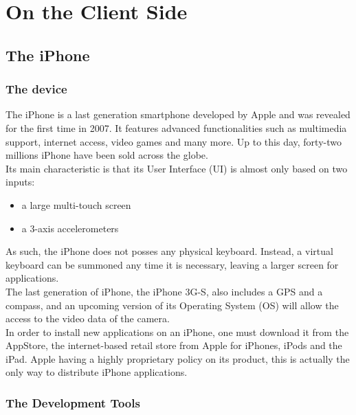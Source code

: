 \chapter{On the Client Side}
\label{cha:on_the_client_side}

\section{The iPhone}
\label{sec:the_iphone}

\subsection{The device}
The iPhone is a last generation smartphone developed by Apple and was revealed for the first time in 2007. It features advanced functionalities such as multimedia support, internet access, video games and many more. Up to this day, forty-two millions iPhone have been sold across the globe.\\

Its main characteristic is that its User Interface (UI) is almost only based on two inputs:
\begin{itemize}
\item{a large multi-touch screen}
\item{a 3-axis accelerometers}
\end{itemize}
As such, the iPhone does not posses any physical keyboard. Instead, a virtual keyboard can be summoned any time it is necessary, leaving a larger screen for applications.\\

The last generation of iPhone, the iPhone 3G-S, also includes a GPS and a compass, and an upcoming version of its Operating System (OS) will allow the access to the video data of the camera.\\

In order to install new applications on an iPhone, one must download it from the AppStore, the internet-based retail store from Apple for iPhones, iPods and the iPad. Apple having a highly proprietary policy on its product, this is actually the only way to distribute iPhone applications.

\subsection{The Development Tools}

